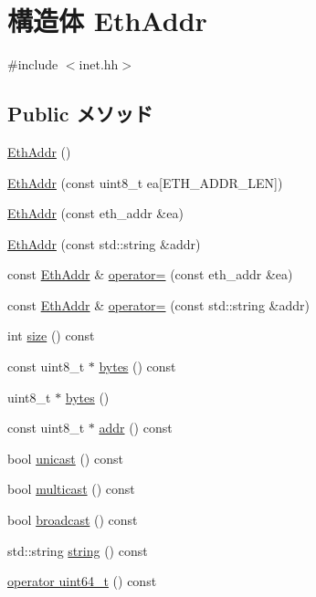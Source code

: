 \hypertarget{structNet_1_1EthAddr}{
\section{構造体 EthAddr}
\label{structNet_1_1EthAddr}
}


{\ttfamily \#include $<$inet.hh$>$}\subsection*{Public メソッド}
\begin{DoxyCompactItemize}
\item 
\hyperlink{structNet_1_1EthAddr_ace178b96ff6b3ce7b06668bfab519ca7}{EthAddr} ()
\item 
\hyperlink{structNet_1_1EthAddr_a67062d2e2b567b16e94cbe0d026ca8f6}{EthAddr} (const uint8\_\-t ea\mbox{[}ETH\_\-ADDR\_\-LEN\mbox{]})
\item 
\hyperlink{structNet_1_1EthAddr_a8cba41ca263992debb1df1cdf1dea37e}{EthAddr} (const eth\_\-addr \&ea)
\item 
\hyperlink{structNet_1_1EthAddr_a86d43efad93c0c40cc1359d14f032367}{EthAddr} (const std::string \&addr)
\item 
const \hyperlink{structNet_1_1EthAddr}{EthAddr} \& \hyperlink{structNet_1_1EthAddr_aadea9643872fce4d806d30964030733e}{operator=} (const eth\_\-addr \&ea)
\item 
const \hyperlink{structNet_1_1EthAddr}{EthAddr} \& \hyperlink{structNet_1_1EthAddr_a2e6f264148c68cd2bd0a77211f925eec}{operator=} (const std::string \&addr)
\item 
int \hyperlink{structNet_1_1EthAddr_ab8e4e3e2a7bf18888b71bdf9dda0770b}{size} () const 
\item 
const uint8\_\-t $\ast$ \hyperlink{structNet_1_1EthAddr_aaa586eeaf354005403ca8e20f961b6c3}{bytes} () const 
\item 
uint8\_\-t $\ast$ \hyperlink{structNet_1_1EthAddr_add4fb6fe45a091194dc9eac521194698}{bytes} ()
\item 
const uint8\_\-t $\ast$ \hyperlink{structNet_1_1EthAddr_a0ac65c3f2d8239c6908c643e8ef77bfb}{addr} () const 
\item 
bool \hyperlink{structNet_1_1EthAddr_a45303c1f67152b8e55f3883c04910da5}{unicast} () const 
\item 
bool \hyperlink{structNet_1_1EthAddr_a129144d2909f78d33eb17f9f8caedb94}{multicast} () const 
\item 
bool \hyperlink{structNet_1_1EthAddr_ae7f045c4687f86f0288db4bd7c1ac6f1}{broadcast} () const 
\item 
std::string \hyperlink{structNet_1_1EthAddr_a14a0e4fdb44bd7be64a3c6e5d94f8f0e}{string} () const 
\item 
\hyperlink{structNet_1_1EthAddr_a6b0df69d39b0e944a8337f52c840be2d}{operator uint64\_\-t} () const 
\end{DoxyCompactItemize}
